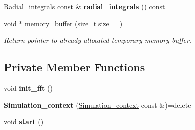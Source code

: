 \begin{DoxyCompactItemize}
\item 
\hypertarget{classsirius_1_1_simulation__context_a87a2ce072d144f882041d4c2c4c03081}{}\hyperlink{classsirius_1_1_radial__integrals}{Radial\+\_\+integrals} const \& {\bfseries radial\+\_\+integrals} () const \label{classsirius_1_1_simulation__context_a87a2ce072d144f882041d4c2c4c03081}

\item 
void $\ast$ \hyperlink{classsirius_1_1_simulation__context_a89851f2e8c84b17689504e5ed3d850ee}{memory\+\_\+buffer} (size\+\_\+t size\+\_\+\+\_\+)
\begin{DoxyCompactList}\small\item\em Return pointer to already allocated temporary memory buffer. \end{DoxyCompactList}\end{DoxyCompactItemize}
\subsection*{Private Member Functions}
\begin{DoxyCompactItemize}
\item 
\hypertarget{classsirius_1_1_simulation__context_a8e24146627210b780a6e61581174349d}{}void {\bfseries init\+\_\+fft} ()\label{classsirius_1_1_simulation__context_a8e24146627210b780a6e61581174349d}

\item 
\hypertarget{classsirius_1_1_simulation__context_ad57209758dc2e9c813a91e03da08ae68}{}{\bfseries Simulation\+\_\+context} (\hyperlink{classsirius_1_1_simulation__context}{Simulation\+\_\+context} const \&)=delete\label{classsirius_1_1_simulation__context_ad57209758dc2e9c813a91e03da08ae68}

\item 
\hypertarget{classsirius_1_1_simulation__context_a0d6536173005e08f917af37942e043da}{}void {\bfseries start} ()\label{classsirius_1_1_simulation__context_a0d6536173005e08f917af37942e043da}

\end{DoxyCompactItemize}
